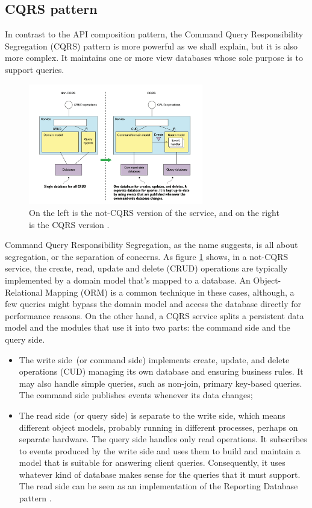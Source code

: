 \documentclass[conference]{IEEEtran}
\begin{document}
\subsection{CQRS pattern}

In contrast to the API composition pattern, the Command Query Responsibility Segregation (CQRS) pattern \cite{cqrs-fowler} is more powerful as we shall explain, but it is also more complex. It maintains one or more view databases whose sole purpose is to support queries.

\begin{figure}[!htbp]
\centering
\includegraphics[width=3in]{jpeg/cqrs}
\caption{On the left is the not-CQRS version of the service, and on the right is the CQRS version \cite{microservices-patterns-cqrs}.}
\label{cqrs}
\end{figure}

Command Query Responsibility Segregation, as the name suggests, is all about segregation, or the separation of concerns. As figure \ref{cqrs} shows, in a not-CQRS service, the create, read, update and delete (CRUD) operations are typically implemented by a domain model that's mapped to a database. An Object-Relational Mapping (ORM) \cite{orm} is a common technique in these cases, although, a few queries might bypass the domain model and access the database directly for performance reasons. On the other hand, a CQRS service splits a persistent data model and the modules that use it into two parts: the command side and the query side.

\begin{itemize}
  \item The write side (or command side) implements create, update, and delete operations (CUD) managing its own database and ensuring business rules. It may also handle simple queries, such as non-join, primary key-based queries. The command side publishes events whenever its data changes;
  \item The read side (or query side) is separate to the write side, which means different object models, probably running in different processes, perhaps on separate hardware. The query side handles only read operations. It subscribes to events produced by the write side and uses them to build and maintain a model that is suitable for answering client queries. Consequently, it uses whatever kind of database makes sense for the queries that it must support. The read side can be seen as an implementation of the Reporting Database pattern \cite{reporting-database}.
\end{itemize}
\end{document}
